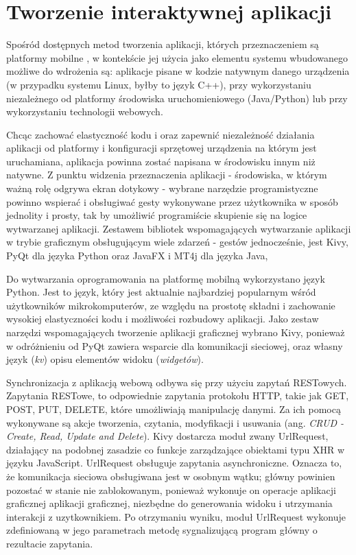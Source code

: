 \section{Tworzenie interaktywnej aplikacji}
\label{subs:Narzędzia do wytwarzania oprogramowania}

Spośród dostępnych metod tworzenia aplikacji, których przeznaczeniem są platformy mobilne \cite{bib:mobile-paradigm}, w kontekście jej użycia jako elementu systemu wbudowanego możliwe do wdrożenia są: aplikacje pisane w kodzie natywnym danego urządzenia (w przypadku systemu Linux, byłby to język C++), przy wykorzystaniu niezależnego od platformy środowiska uruchomieniowego (Java/Python) lub przy wykorzystaniu technologii webowych.

Chcąc zachować elastyczność kodu i oraz zapewnić niezależność działania aplikacji od platformy i konfiguracji sprzętowej urządzenia na którym jest uruchamiana, aplikacja powinna zostać napisana w środowisku innym niż natywne. Z punktu widzenia przeznaczenia aplikacji - środowiska, w którym ważną rolę odgrywa ekran dotykowy - wybrane narzędzie programistyczne powinno wspierać i obsługiwać gesty wykonywane przez użytkownika w sposób jednolity i prosty, tak by umożliwić programiście skupienie się na logice wytwarzanej aplikacji. Zestawem bibliotek wspomagających wytwarzanie aplikacji w trybie graficznym obsługującym wiele zdarzeń - gestów jednocześnie, jest Kivy, PyQt dla języka Python oraz JavaFX i MT4j dla języka Java,

Do wytwarzania oprogramowania na platformę mobilną wykorzystano język Python. Jest to język, który jest aktualnie najbardziej popularnym wśród użytkowników mikrokomputerów, ze względu na prostotę składni i zachowanie wysokiej elastyczności kodu i możliwości rozbudowy aplikacji. Jako zestaw narzędzi wspomagających tworzenie aplikacji graficznej wybrano Kivy, ponieważ w odróżnieniu od PyQt zawiera wsparcie dla komunikacji sieciowej, oraz własny język (\textit{kv}) opisu elementów widoku (\textit{widgetów}).

Synchronizacja z aplikacją webową odbywa się przy użyciu zapytań RESTowych. Zapytania RESTowe, to odpowiednie zapytania protokołu HTTP, takie jak GET, POST, PUT, DELETE, które umożliwiają manipulację danymi. Za ich pomocą wykonywane są akcje tworzenia, czytania, modyfikacji i usuwania (ang. \textit{CRUD - Create, Read, Update and Delete}). Kivy dostarcza moduł zwany  UrlRequest, działający na podobnej zasadzie co funkcje zarządzające obiektami typu XHR\cite{bib:xhr} w języku JavaScript. UrlRequest obsługuje zapytania asynchroniczne. Oznacza to, że komunikacja sieciowa obsługiwana jest w osobnym wątku; główny powinien pozostać w stanie nie zablokowanym, ponieważ wykonuje on operacje aplikacji graficznej aplikacji graficznej, niezbędne do generowania widoku i utrzymania interakcji z uzytkownikiem. Po otrzymaniu wyniku, moduł UrlRequest wykonuje zdefiniowaną w jego parametrach metodę sygnalizującą program główny o rezultacie zapytania.

